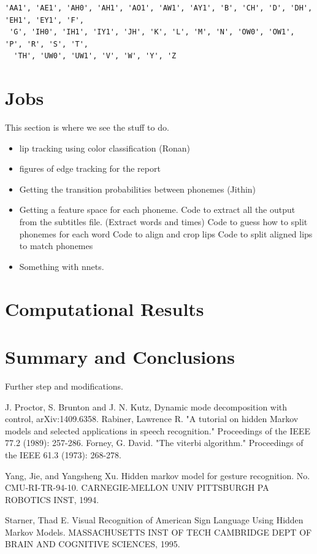 \documentclass[a4paper]{article}
\begin{document}
\begin{verbatim}
'AA1', 'AE1', 'AH0', 'AH1', 'AO1', 'AW1', 'AY1', 'B', 'CH', 'D', 'DH', 'EH1', 'EY1', 'F', 
 'G', 'IH0', 'IH1', 'IY1', 'JH', 'K', 'L', 'M', 'N', 'OW0', 'OW1', 'P', 'R', 'S', 'T',
  'TH', 'UW0', 'UW1', 'V', 'W', 'Y', 'Z
\end{verbatim}

\section{Jobs}

This section is where we see the stuff to do.

\begin{itemize}
	\item lip tracking using color classification (Ronan)
	\item figures of edge tracking for the report 
	\item Getting the transition probabilities between phonemes (Jithin)
	\item Getting a feature space for each phoneme.
	\subitem Code to extract all the output from the subtitles file. (Extract words and times)
	\subitem Code to guess how to split phonemes for each word 
	\subitem Code to align and crop lips 
	\subitem Code to split aligned lips to match phonemes
	\item Something with nnets.
\end{itemize}

\section{Computational Results}

\section{Summary and Conclusions}

Further step and modifications.



\begin{thebibliography}{1}
	J. Proctor, S. Brunton and J. N. Kutz, Dynamic mode decomposition with control, arXiv:1409.6358.
	Rabiner, Lawrence R. "A tutorial on hidden Markov models and selected applications in speech recognition." Proceedings of the IEEE 77.2 (1989): 257-286.	
	Forney, G. David. "The viterbi algorithm." Proceedings of the IEEE 61.3 (1973): 268-278.
	
	Yang, Jie, and Yangsheng Xu. Hidden markov model for gesture recognition. No. CMU-RI-TR-94-10. CARNEGIE-MELLON UNIV PITTSBURGH PA ROBOTICS INST, 1994.

	Starner, Thad E. Visual Recognition of American Sign Language Using Hidden Markov Models. MASSACHUSETTS INST OF TECH CAMBRIDGE DEPT OF BRAIN AND COGNITIVE SCIENCES, 1995.
	

\end{thebibliography}
\end{document}
